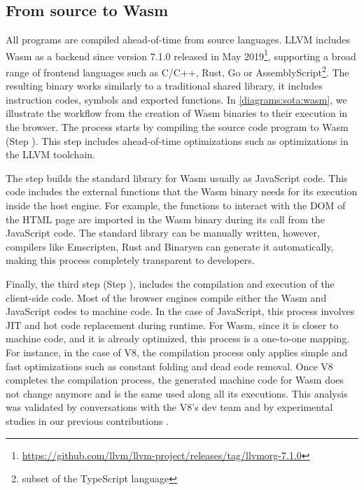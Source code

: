 
\subsection{From source to Wasm}

All \wasm programs are compiled ahead-of-time from source languages. LLVM includes Wasm  as a backend since version 7.1.0 released in May 2019\footnote{\url{https://github.com/llvm/llvm-project/releases/tag/llvmorg-7.1.0}}, supporting a broad range of frontend languages such as C/C++, Rust, Go or AssemblyScript\footnote{subset of the TypeScript language}. The resulting binary works similarly to a traditional shared library, it includes instruction codes, symbols and exported functions. In \autoref{diagrams:sota:wasm}, we illustrate the workflow from the creation of Wasm  binaries to their execution in the browser. The process starts by compiling the source code program to Wasm  (Step ). This step includes ahead-of-time optimizations such as optimizations in the LLVM toolchain. 


The step  builds the standard library for Wasm  usually as JavaScript  code. This code includes the external functions that the Wasm  binary needs for its execution inside the host engine. For example, the functions to interact with the DOM of the HTML page are imported in the Wasm  binary during its call from the JavaScript code. The standard library can be manually written, however, compilers like Emscripten, Rust and Binaryen can generate it automatically, making this process completely transparent to developers.

Finally, the third step (Step ), includes the compilation and execution of the client-side code. Most of the browser engines compile either the Wasm  and JavaScript codes to machine code. In the case of JavaScript, this process involves JIT and hot code replacement during runtime. For Wasm, since it is closer to machine code, and it is already optimized, this process is a one-to-one mapping. For instance, in the case of V8, the compilation process only applies simple and fast optimizations such as constant folding and dead code removal. Once V8 completes the compilation process, the generated machine code for Wasm does not change anymore and is the same used along all its executions. This analysis was validated by conversations with the V8's dev team and by experimental studies in our previous contributions \cite{CROW}.  

